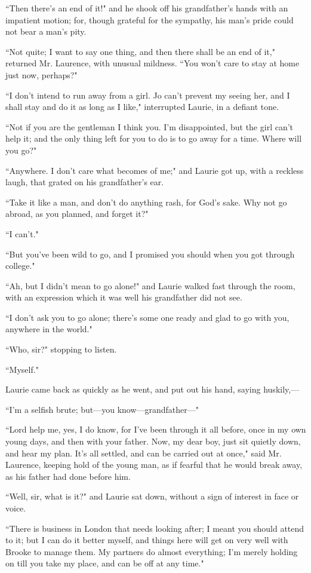 ``Then there's an end of it!" and he shook off his
grandfather's hands with an impatient motion; for,
though grateful for the sympathy, his man's pride could
not bear a man's pity.

``Not quite; I want to say one thing, and then there shall be an end of
it," returned Mr. Laurence, with unusual mildness. ``You
won't care to stay at home just now, perhaps?"

``I don't intend to run away from a girl. Jo
can't prevent my seeing her, and I shall stay and do it
as long as I like," interrupted Laurie, in a defiant tone.

``Not if you are the gentleman I think you. I'm
disappointed, but the girl can't help it; and the only
thing left for you to do is to go away for a time. Where will you go?"

``Anywhere. I don't care what becomes of me;" and Laurie
got up, with a reckless laugh, that grated on his
grandfather's ear.

``Take it like a man, and don't do anything rash, for
God's sake. Why not go abroad, as you planned, and
forget it?"

``I can't."

``But you've been wild to go, and I promised you should
when you got through college."

``Ah, but I didn't mean to go alone!" and Laurie walked
fast through the room, with an expression which it was well his
grandfather did not see.

``I don't ask you to go alone; there's
some one ready and glad to go with you, anywhere in the world."

``Who, sir?" stopping to listen.

``Myself."

Laurie came back as quickly as he went, and put out his hand, saying
huskily,---

``I'm a selfish brute; but---you know---grandfather---"

``Lord help me, yes, I do know, for I've been through it
all before, once in my own young days, and then with your father. Now,
my dear boy, just sit quietly down, and hear my plan.
It's all settled, and can be carried out at once," said
Mr. Laurence, keeping hold of the young man, as if fearful that he would
break away, as his father had done before him.

``Well, sir, what is it?" and Laurie sat down, without a sign of interest
in face or voice.

``There is business in London that needs looking after; I meant you
should attend to it; but I can do it better myself, and things here will
get on very well with Brooke to manage them. My partners do almost
everything; I'm merely holding on till you take my
place, and can be off at any time."

